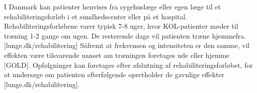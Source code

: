 I Danmark kan patienter henvises fra sygehuslæge eller egen læge til et rehabiliteringsforløb i et sundhedscenter eller på et hospital. Rehabiliteringsforløbene varer typisk 7-8 uger, hvor KOL-patienter møder til træning 1-2 gange om ugen. De resterende dage vil patienten træne hjemmefra. [lunge.dk/rehabilitering] 
Såfremt at frekvensen og intensiteten er den samme, vil effekten være tilsvarende uanset om træningen foretages ude eller hjemme [GOLD]. Opfølgninger kan foretages efter afslutning af rehabiliteringsforløbet, for at undersøge om patienten efterfølgende opretholder de gavnlige effekter [lunge.dk/rehabilitering]. 